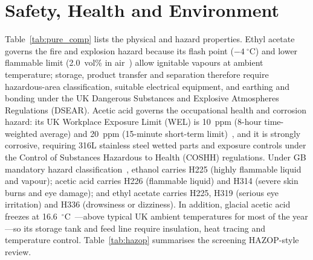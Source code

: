 \documentclass[10pt,a4paper]{article}
\begin{document}
\section{Safety, Health and Environment}

Table~\ref{tab:pure_comp} lists the physical and hazard properties. Ethyl acetate governs the fire and explosion hazard because its flash point ($-4~^\circ$C) and lower flammable limit (2.0~vol\% in air~\cite{ref4}) allow ignitable vapours at ambient temperature; storage, product transfer and separation therefore require hazardous-area classification, suitable electrical equipment, and earthing and bonding under the UK Dangerous Substances and Explosive Atmospheres Regulations (DSEAR). Acetic acid governs the occupational health and corrosion hazard: its UK Workplace Exposure Limit (WEL) is 10~ppm (8-hour time-weighted average) and 20~ppm (15-minute short-term limit)~\cite{ref6}, and it is strongly corrosive, requiring 316L stainless steel wetted parts and exposure controls under the Control of Substances Hazardous to Health (COSHH) regulations. Under GB mandatory hazard classification~\cite{ref21,ref22}, ethanol carries H225 (highly flammable liquid and vapour); acetic acid carries H226 (flammable liquid) and H314 (severe skin burns and eye damage); and ethyl acetate carries H225, H319 (serious eye irritation) and H336 (drowsiness or dizziness). In addition, glacial acetic acid freezes at 16.6~$^\circ$C~\cite{ref5}---above typical UK ambient temperatures for most of the year---so its storage tank and feed line require insulation, heat tracing and temperature control. Table~\ref{tab:hazop} summarises the screening HAZOP-style review.
\end{document}
